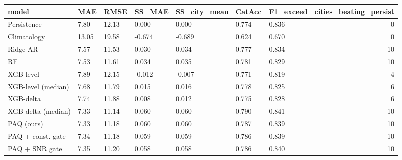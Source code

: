\begin{tabular}{lllllllr}
\toprule
model & MAE & RMSE & SS\_MAE & SS\_city\_mean & CatAcc & F1\_exceed & cities\_beating\_persist \\
\midrule
Persistence & 7.80 & 12.13 & 0.000 & 0.000 & 0.774 & 0.836 & 0 \\
Climatology & 13.05 & 19.58 & -0.674 & -0.689 & 0.624 & 0.670 & 0 \\
Ridge-AR & 7.57 & 11.53 & 0.030 & 0.034 & 0.777 & 0.834 & 10 \\
RF & 7.53 & 11.61 & 0.034 & 0.035 & 0.781 & 0.829 & 10 \\
XGB-level & 7.89 & 12.15 & -0.012 & -0.007 & 0.771 & 0.819 & 4 \\
XGB-level (median) & 7.68 & 11.79 & 0.015 & 0.016 & 0.778 & 0.825 & 6 \\
XGB-delta & 7.74 & 11.88 & 0.008 & 0.012 & 0.775 & 0.828 & 6 \\
XGB-delta (median) & 7.33 & 11.14 & 0.060 & 0.060 & 0.790 & 0.841 & 10 \\
PAQ (ours) & 7.33 & 11.18 & 0.060 & 0.060 & 0.787 & 0.839 & 10 \\
PAQ + const. gate & 7.34 & 11.18 & 0.059 & 0.059 & 0.786 & 0.839 & 10 \\
PAQ + SNR gate & 7.35 & 11.20 & 0.058 & 0.058 & 0.786 & 0.840 & 10 \\
\bottomrule
\end{tabular}
